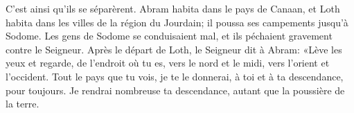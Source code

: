 C’est ainsi qu’ils se séparèrent.
Abram habita dans le pays de Canaan,
	et Loth habita dans les villes de la région du Jourdain;
	il poussa ses campements jusqu’à Sodome.
Les gens de Sodome se conduisaient mal, et ils péchaient gravement contre le Seigneur.
Après le départ de Loth, le Seigneur dit à Abram:
	«Lève les yeux et regarde, de l’endroit où tu es,
	vers le nord et le midi, vers l’orient et l’occident.
Tout le pays que tu vois, je te le donnerai, à toi et à ta descendance, pour toujours.
Je rendrai nombreuse ta descendance, autant que la poussière de la terre.
